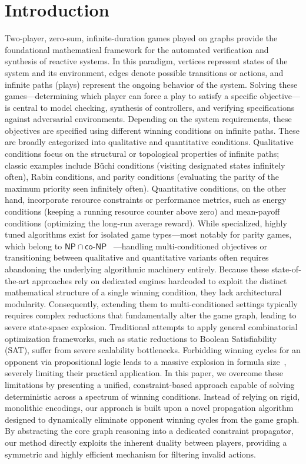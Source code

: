 \documentclass[a4paper,fleqn]{cas-sc}
\begin{document}
\newpage
\tableofcontents
\newpage

\section{Introduction}
Two-player, zero-sum, infinite-duration games played on graphs provide the foundational mathematical framework for the automated verification and synthesis of reactive systems. In this paradigm, vertices represent states of the system and its environment, edges denote possible transitions or actions, and infinite paths (plays) represent the ongoing behavior of the system. Solving these games—determining which player can force a play to satisfy a specific objective—is central to model checking, synthesis of controllers, and verifying specifications against adversarial environments.
%
Depending on the system requirements, these objectives are specified using different winning conditions on infinite paths. These are broadly categorized into qualitative and quantitative conditions. Qualitative conditions focus on the structural or topological properties of infinite paths; classic examples include Büchi conditions (visiting designated states infinitely often), Rabin conditions, and parity conditions (evaluating the parity of the maximum priority seen infinitely often). Quantitative conditions, on the other hand, incorporate resource constraints or performance metrics, such as energy conditions (keeping a running resource counter above zero) and mean-payoff conditions (optimizing the long-run average reward).
%
While specialized, highly tuned algorithms exist for isolated game types—most notably for parity games, which belong to $\mathsf{NP} \cap \mathsf{co\textit{-}NP}$~\cite{Jurdziński:1998}  —handling multi-conditioned objectives or transitioning between qualitative and quantitative variants often requires abandoning the underlying algorithmic machinery entirely. Because these state-of-the-art approaches rely on dedicated engines hardcoded to exploit the distinct mathematical structure of a single winning condition, they lack architectural modularity. Consequently, extending them to multi-conditioned settings typically requires complex reductions that fundamentally alter the game graph, leading to severe state-space explosion.
%
Traditional attempts to apply general combinatorial optimization frameworks, such as static reductions to Boolean Satisfiability (SAT), suffer from severe scalability bottlenecks. Forbidding winning cycles for an opponent via propositional logic leads to a massive explosion in formula size~\cite{Heljanko:2012}, severely limiting their practical application. In this paper, we overcome these limitations by presenting a unified, constraint-based approach capable of solving deterministic \wregulargames across a spectrum of winning conditions. Instead of relying on rigid, monolithic encodings, our approach is built upon a novel propagation algorithm designed to dynamically eliminate opponent winning cycles from the game graph. By abstracting the core graph reasoning into a dedicated constraint propagator, our method directly exploits the inherent duality between players, providing a symmetric and highly efficient mechanism for filtering invalid actions.
\end{document}
